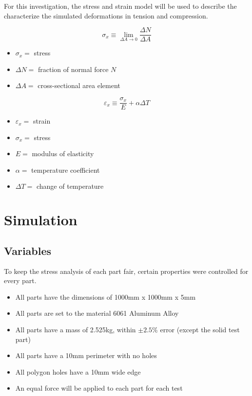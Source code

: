 \documentclass[12pt, letterpaper]{article}
\begin{document}
For this investigation, the stress and strain model will be used to describe the characterize the simulated deformations in tension and compression. 

\begin{singlespace}
\begin{equation}
	\label{eq:stress}
	\sigma_x \equiv \lim_{\Delta A \rightarrow 0} \frac{\Delta N}{\Delta A}
\end{equation}
\begin{small}
\begin{itemize}
\item[] $\sigma_x =$ stress
\item[] $\Delta N =$ fraction of normal force $N$
\item[] $\Delta A =$ cross-sectional area element
\end{itemize}
\end{small}
\end{singlespace}


\begin{singlespace}
\begin{equation}
	\label{eq:strain}
	\varepsilon_x \equiv \frac{\sigma_x}{E} + \alpha \Delta T
\end{equation}
\begin{small}
\begin{itemize}
\item[] $\varepsilon_x =$ strain
\item[] $\sigma_x =$ stress
\item[] $E =$ modulus of elasticity
\item[] $\alpha =$ temperature coefficient
\item[] $\Delta T =$ change of temperature
\end{itemize}
\end{small}
\end{singlespace}

\section{Simulation}
\label{sec:simulation}

\subsection{Variables}
\label{sec:variables}

To keep the stress analysis of each part fair, certain properties were controlled for every part. 

\begin{itemize}
\item All parts have the dimensions of 1000mm x 1000mm x 5mm
\item All parts are set to the material 6061 Aluminum Alloy
\item All parts have a mass of 2.525kg, within $\pm2.5\%$ error (except the solid test part)
\item All parts have a 10mm perimeter with no holes
\item All polygon holes have a 10mm wide edge
\item An equal force will be applied to each part for each test
\end{itemize}
\end{document}
